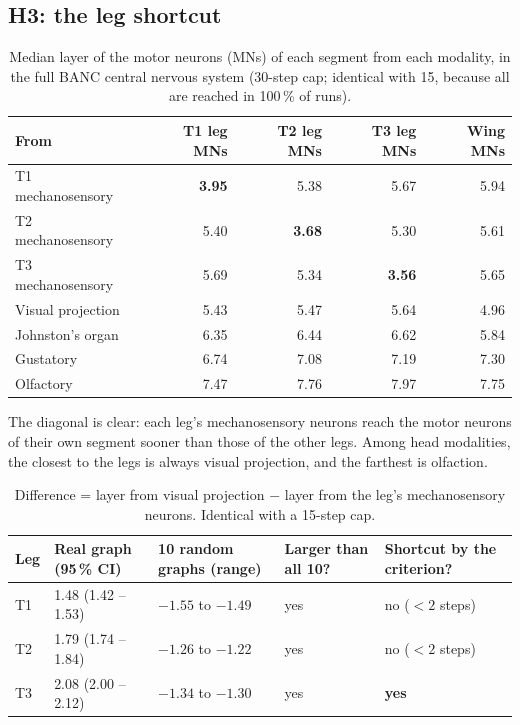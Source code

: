 \documentclass[11pt,letterpaper]{article}
\begin{document}
\subsection{H3: the leg shortcut}

\begin{table}[H]
\centering
\small
\begin{tabularx}{\linewidth}{@{}LRRRR@{}}
\toprule
\textbf{From} & \textbf{T1 leg MNs} & \textbf{T2 leg MNs} & \textbf{T3 leg MNs} & \textbf{Wing MNs} \\
\midrule
T1 mechanosensory & \textbf{3.95} & 5.38 & 5.67 & 5.94 \\
T2 mechanosensory & 5.40 & \textbf{3.68} & 5.30 & 5.61 \\
T3 mechanosensory & 5.69 & 5.34 & \textbf{3.56} & 5.65 \\
Visual projection & 5.43 & 5.47 & 5.64 & 4.96 \\
Johnston's organ & 6.35 & 6.44 & 6.62 & 5.84 \\
Gustatory & 6.74 & 7.08 & 7.19 & 7.30 \\
Olfactory & 7.47 & 7.76 & 7.97 & 7.75 \\
\bottomrule
\end{tabularx}
\caption{Median layer of the motor neurons (MNs) of each segment from each modality, in the full BANC central nervous system (30-step cap; identical with 15, because all are reached in 100\,\% of runs).}
\end{table}

\noindent The diagonal is clear: each leg's mechanosensory neurons reach the motor neurons of their own segment sooner than those of the other legs. Among head modalities, the closest to the legs is always visual projection, and the farthest is olfaction.

\begin{table}[H]
\centering
\small
\begin{tabularx}{\linewidth}{@{}p{1.2cm}XXp{2.2cm}p{2.6cm}@{}}
\toprule
\textbf{Leg} & \textbf{Real graph (95\,\% CI)} & \textbf{10 random graphs (range)} & \textbf{Larger than all 10?} & \textbf{Shortcut by the criterion?} \\
\midrule
T1 & 1.48 (1.42 -- 1.53) & $-1.55$ to $-1.49$ & yes & no ($<2$ steps) \\
T2 & 1.79 (1.74 -- 1.84) & $-1.26$ to $-1.22$ & yes & no ($<2$ steps) \\
T3 & 2.08 (2.00 -- 2.12) & $-1.34$ to $-1.30$ & yes & \textbf{yes} \\
\bottomrule
\end{tabularx}
\caption{Difference = layer from visual projection $-$ layer from the leg's mechanosensory neurons. Identical with a 15-step cap.}
\end{table}
\end{document}
